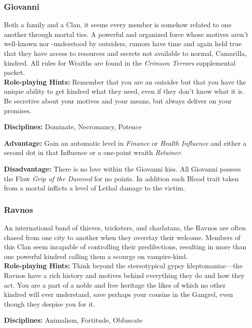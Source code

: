 \subsubsection{Giovanni}
Both a family and a Clan, it seems every member is somehow related to one another 
through mortal ties.  A powerful and organized force whose motives aren't well-known 
nor -understood by outsiders, rumors have time and again held true that they have 
access to resources and secrets not available to normal, Camarilla, kindred.  All rules 
for Wraiths are found in the \emph{Crimson Terrors} supplemental packet. \\

\textbf{Role-playing Hints:}  Remember that you are an outsider but that you have 
the unique ability to get kindred what they need, even if they don't know what it is.  
Be secretive about your motives and your means, but always deliver on your promises.

\textbf{Disciplines:}  Dominate, Necromancy, Potence

\textbf{Advantage:}  Gain an automatic level in \emph{Finance} or \emph{Health Influence} 
and either a second dot in that Influence or a one-point wraith \emph{Retainer}.

\textbf{Disadvantage:}  There is no love within the Giovanni kiss.  All Giovanni 
possess the Flaw \emph{Grip of the Damned} for no points.  In addition each Blood trait 
taken from a mortal inflicts a level of Lethal damage to the victim.

\subsubsection{Ravnos}
An international band of thieves, tricksters, and charlatans, the Ravnos are often 
chased from one city to another when they overstay their welcome.  Members of this Clan 
seem incapable of controlling their predilections, resulting in more than one powerful 
kindred calling them a scourge on vampire-kind. \\

\textbf{Role-playing Hints:}  Think beyond the stereotypical gypsy 
kleptomaniac---the Ravnos have a rich history and motives behind everything they do and 
how they act.  You are a part of a noble and free heritage the likes of which no other 
kindred will ever understand, save perhaps your cousins in the Gangrel, even though they 
despise you for it.

\textbf{Disciplines:}  Animalism, Fortitude, Obfuscate


